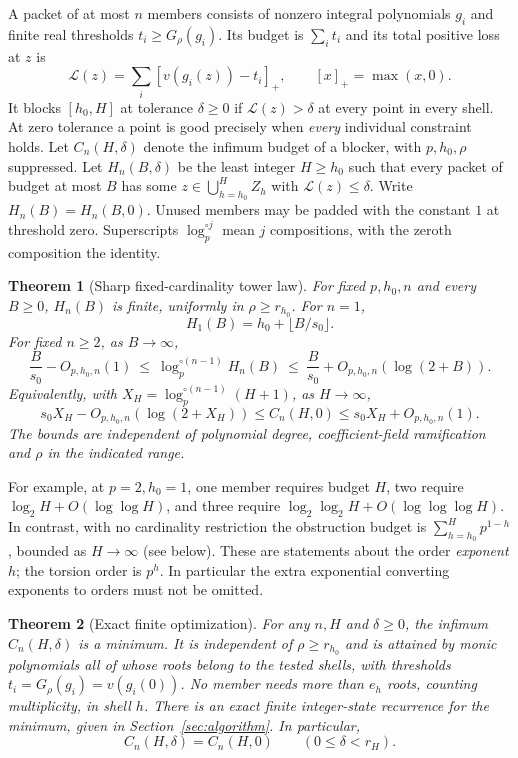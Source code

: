 \documentclass[11pt]{article}
\newtheorem{theorem}{Theorem}[section]
\theoremstyle{remark}\newtheorem{remark}[theorem]{Remark}
\newcommand{\pos}[1]{\left[#1\right]_+}
\begin{document}
A packet of at most $n$ members consists of nonzero integral polynomials $g_i$ and finite real thresholds $t_i\ge G_\rho(g_i)$. Its budget is $\sum_i t_i$ and its total positive loss at $z$ is
\[
 \mathcal L(z)=\sum_i\pos{v(g_i(z))-t_i},\qquad [x]_+=\max(x,0).
\]
It blocks $[h_0,H]$ at tolerance $\delta\ge0$ if $\mathcal L(z)>\delta$ at every point in every shell. At zero tolerance a point is good precisely when \emph{every} individual constraint holds. Let $C_n(H,\delta)$ denote the infimum budget of a blocker, with $p,h_0,\rho$ suppressed. Let $H_n(B,\delta)$ be the least integer $H\ge h_0$ such that every packet of budget at most $B$ has some $z\in\bigcup_{h=h_0}^H Z_h$ with $\mathcal L(z)\le\delta$. Write $H_n(B)=H_n(B,0)$. Unused members may be padded with the constant $1$ at threshold zero. Superscripts $\log_p^{\circ j}$ mean $j$ compositions, with the zeroth composition the identity.

\begin{theorem}[Sharp fixed-cardinality tower law]\label{thm:main}
For fixed $p,h_0,n$ and every $B\ge0$, $H_n(B)$ is finite, uniformly in $\rho\ge r_{h_0}$. For $n=1$,
\[
 H_1(B)=h_0+\lfloor B/s_0\rfloor.
\]
For fixed $n\ge2$, as $B\to\infty$,
\begin{equation}\label{eq:tower}
 \frac{B}{s_0}-O_{p,h_0,n}(1)\ \le\ \log_p^{\circ(n-1)}H_n(B)
 \ \le\ \frac{B}{s_0}+O_{p,h_0,n}(\log(2+B)).
\end{equation}
Equivalently, with $X_H=\log_p^{\circ(n-1)}(H+1)$, as $H\to\infty$,
\begin{equation}\label{eq:inverse}
 s_0X_H-O_{p,h_0,n}(\log(2+X_H))\le C_n(H,0)\le s_0X_H+O_{p,h_0,n}(1).
\end{equation}
The bounds are independent of polynomial degree, coefficient-field ramification and $\rho$ in the indicated range.
\end{theorem}

For example, at $p=2,h_0=1$, one member requires budget $H$, two require $\log_2 H+O(\log\log H)$, and three require $\log_2\log_2 H+O(\log\log\log H)$. In contrast, with no cardinality restriction the obstruction budget is $\sum_{h=h_0}^H p^{1-h}$, bounded as $H\to\infty$ (see below). These are statements about the order \emph{exponent} $h$; the torsion order is $p^h$. In particular the extra exponential converting exponents to orders must not be omitted.

\begin{theorem}[Exact finite optimization]\label{thm:finite}
For any $n,H$ and $\delta\ge0$, the infimum $C_n(H,\delta)$ is a minimum. It is independent of $\rho\ge r_{h_0}$ and is attained by monic polynomials all of whose roots belong to the tested shells, with thresholds $t_i=G_\rho(g_i)=v(g_i(0))$. No member needs more than $e_h$ roots, counting multiplicity, in shell $h$. There is an exact finite integer-state recurrence for the minimum, given in Section~\ref{sec:algorithm}. In particular,
\[
 C_n(H,\delta)=C_n(H,0)\qquad (0\le\delta<r_H).
\]
\end{theorem}
\end{document}
